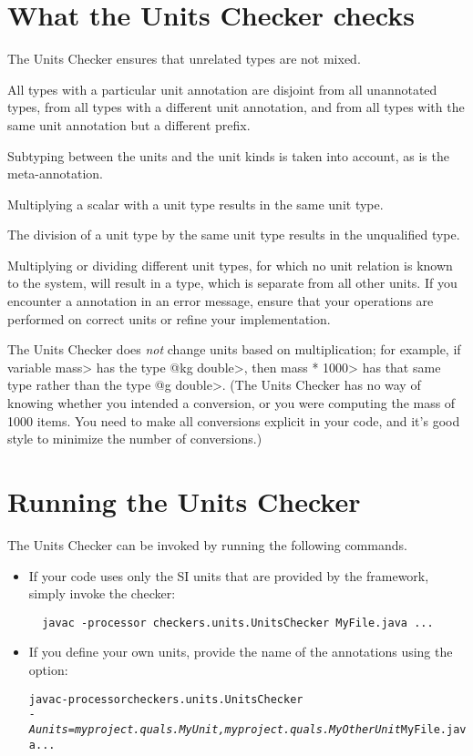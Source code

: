 \section{What the Units Checker checks\label{units-checks}}

The Units Checker ensures that unrelated types are not mixed. 

All types with a particular unit annotation are
disjoint from all unannotated types, from all types with a different unit
annotation, and from all types with the same unit annotation but a
different prefix.

Subtyping between the units and the unit kinds is taken into account,
as is the  meta-annotation.

Multiplying a scalar with a unit type results in the same unit type.

The division of a unit type by the same unit type
results in the unqualified type.

Multiplying or dividing different unit types, for which no unit
relation is known to the system, will result in a 
type, which is separate from all other units.
If you encounter a  annotation in an error message,
ensure that your operations are performed on correct units or refine
your  implementation.

The Units Checker does \emph{not} change units based on multiplication; for
example, if variable \<mass> has the type \<@kg double>, then \<mass *
1000> has that same type rather than the type \<@g double>.  (The Units
Checker has no way of knowing whether you intended a conversion, or you
were computing the mass of 1000 items.  You need to make all conversions
explicit in your code, and it's good style to minimize the number of
conversions.)


\section{Running the Units Checker\label{units-running}}

The Units Checker can be invoked by running the following commands.

\begin{itemize}
\item
If your code uses only the SI units that are provided by the
framework, simply invoke the checker:

\begin{Verbatim}
  javac -processor checkers.units.UnitsChecker MyFile.java ...
\end{Verbatim}

\item 
If you define your own units, provide the name of the annotations using the
 option:

\begin{alltt}
  javac -processor checkers.units.UnitsChecker \ttbs
        \textit{-Aunits=myproject.quals.MyUnit,myproject.quals.MyOtherUnit} MyFile.java ...
\end{alltt}
\end{itemize}



